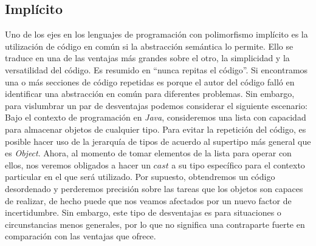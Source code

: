 \documentclass[12pt]{article}
\begin{document}
\subsection*{Implícito}
Uno de los ejes en los lenguajes de programación con polimorfismo implícito es la utilización de código en común si la abstracción semántica
lo permite. Ello se traduce en una de las ventajas más grandes sobre el otro, la simplicidad y la versatilidad del código. Es resumido en ``nunca repitas el código''. Si encontramos una o más secciones de código repetidas es porque el autor del código falló en identificar una abstracción en común para diferentes problemas. Sin embargo, para vislumbrar un par de desventajas podemos considerar el siguiente escenario:
Bajo el contexto de programación en \textit{Java}, consideremos una lista con capacidad para almacenar objetos de cualquier tipo. Para evitar la
repetición del código, es posible hacer uso de la jerarquía de tipos de acuerdo al supertipo más general que es \textit{Object}. Ahora, al momento de tomar elementos de la lista para operar con ellos, nos veremos obligados a hacer un $cast$ a su tipo específico para el contexto particular en el que será utilizado. Por supuesto, obtendremos un código desordenado y perderemos precisión sobre las tareas que los objetos son capaces de realizar, de hecho puede que nos veamos afectados por un nuevo factor de incertidumbre.
Sin embargo, este tipo de desventajas es para situaciones o circunstancias menos generales, por lo que no significa una contraparte fuerte en
comparación con las ventajas que ofrece.
\end{document}
